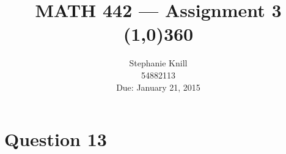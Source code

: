 \documentclass[11pt, oneside]{article}   	%
\begin{document}
\title{MATH 442 --- Assignment 3 \\
\line(1,0){360} \\              %
}
\author{
Stephanie Knill \\
54882113 \\
Due: January 21, 2015}

\date{}                   %
\maketitle


\thispagestyle{empty}                   %


\section*{Question 13}
\end{document}
